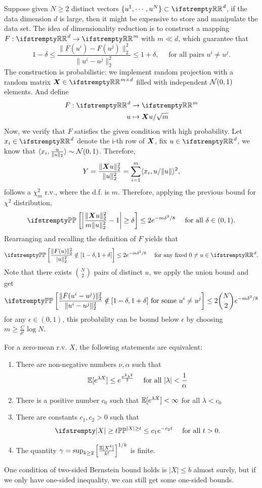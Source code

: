\documentclass{paper}
\begin{document}
\begin{exmp}
	Suppose given $N\geq 2$ distinct vectors $\{u^1, \cdots, u^N\}\subset\RR^d$, if the data dimension $d$ is large, then it might be expensive to store and manipulate the data set.
	The idea of dimensionality reduction is to construct a mapping $F:\RR^d\to\RR^m$ with $m\ll d$, which guarantee that
	\[
		1-\delta \leq \frac{\lVert F(u^i)-F(u^j)\rVert_2^2}{\lVert u^i-u^j\rVert_2^2} \leq 1+\delta, \quad \text{ for all pairs } u^i\neq u^j.
	\]
	The construction is probabilistic: we implement random projection with a random matrix $\bmX\in\RR^{m\times d}$ filled with independent $\mathcal{N}(0, 1)$ elements. And define
	\begin{align*}
		F: \RR^d & \to \RR^m               \\
		u        & \mapsto \bmX u/\sqrt{m}
	\end{align*}
	Now, we verify that $F$ satisfies the given condition with high probability. Let $x_i\in \RR^d$ denote the i-th row of $\boldsymbol{X}$, fix $u\in\RR^d$,
	we know that $\langle x_i, \frac{u}{\lVert u\rVert_2}\rangle \sim \mathcal{N}(0, 1)$. Therefore,
	\[
		Y = \frac{\lVert \boldsymbol{X} u\rVert_2^2}{\lVert u\rVert_2^2} = \sum_{i=1}^{m}\langle x_i, u/\lVert u\rVert\rangle^2,
	\]
	follows a $\chi_m^2$ r.v., where the d.f. is $m$. Therefore, applying the previous bound for $\chi^2$ distribution,
	\[
		\PP\left[\left\vert\frac{\lVert\bmX u\rVert_2^2}{m\lVert u\rVert_2^2} - 1\right\vert\geq \delta\right] \leq 2e^{-m\delta^2/8} \quad \text{ for all } \delta \in (0, 1).
	\]
	Rearranging and recalling the definition of $F$ yields that
	\[
		\PP\left[\frac{\lVert F(u)\rVert_2^2}{\lvert u\rVert_2^2}\notin[1-\delta, 1+\delta]\right]\leq 2e^{-m\delta^2/8} \quad \text{ for any fixed } 0\neq u\in\RR^d.
	\]
	Note that there exists $\binom{N}{2}$ pairs of distinct $u$, we apply the union bound and get
	\[
		\PP\left[\frac{\lVert F(u^i-u^j)\rVert_2^2}{\lVert u^i-u^j\rVert_2^2}\notin[1-\delta, 1+\delta]\text{ for some } u^i\neq u^j\right]\leq 2\binom{N}{2}e^{-m\delta^2/8}
	\]
	for any $\epsilon\in(0, 1)$, this probability can be bound below $\epsilon$ by choosing $m\geq \frac{C}{\delta^2}\log N$.
\end{exmp}
\begin{thm}
	For a zero-mean r.v. $X$, the following statements are equivalent:
	\begin{enumerate}
		\item There are non-negative numbers $\nu, \alpha$ such that
		      \[
			      \mathbb{E}[e^{\lambda X}]\leq e^{\frac{\nu^2\lambda^2}{2}}\quad \text{ for all } \vert \lambda\vert < \frac{1}{\alpha}
		      \]
		\item There is a positive number $c_0$ such that $\mathbb{E}[e^{\lambda X}]<\infty$ for all $\lambda<c_0$
		\item There are constants $c_1, c_2>0$ such that
		      \[
			      \PP[\vert X\vert\geq t] \leq c_1e^{-c_2t} \quad \text{ for all } t>0.
		      \]
		\item The quantity $\gamma=\sup_{k\geq 2}\left[\frac{\mathbb{E}[X^k]}{k!}\right]^{1/k}$ is finite.
	\end{enumerate}
\end{thm}
One condition of two-sided Bernstein bound holds is $\vert X\vert \leq b$ almost surely, but if we only have one-sided inequality, we can still get some one-sided bounds.

\printbibliography
\end{document}

